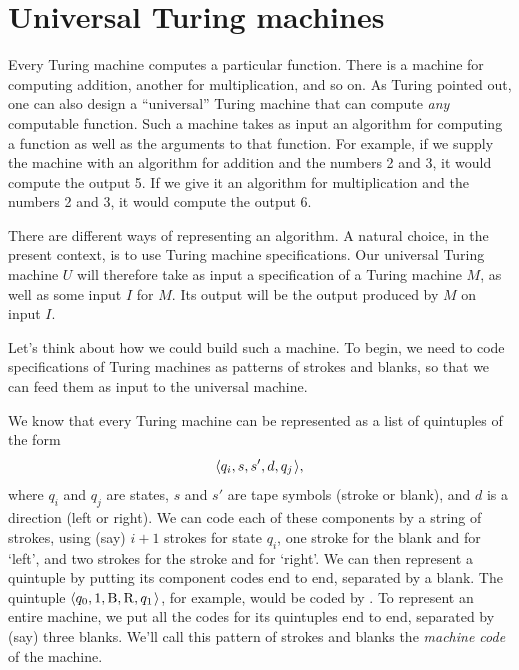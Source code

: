 \section{Universal Turing machines}\label{sec:universal-tm}


Every Turing machine computes a particular function.
There is a machine for computing addition,
another for multiplication,
and so on.
As Turing pointed out,
one can also design a ``universal'' Turing machine that
can compute \emph{any} computable function.
Such a machine takes as input
an algorithm for computing a function
as well as the arguments to that function.
For example,
if we supply the machine with an algorithm for addition and the numbers 2 and 3,
it would compute the output 5.
If we give it an algorithm for multiplication and the numbers 2 and 3,
it would compute the output 6.

There are different ways of representing an algorithm.
A natural choice,
in the present context,
is to use Turing machine specifications.
Our universal Turing machine $U$ will therefore take as input
a specification of a Turing machine $M$,
as well as some input $I$ for $M$.
Its output will be the output produced by $M$ on input $I$.

Let's think about how we could build such a machine.
To begin,
we need to code specifications of Turing machines as patterns of strokes and blanks,
so that we can feed them as input to the universal machine.

We know that every Turing machine can be represented as a list of quintuples of the form
\[
  \t{q_{i}, s, s', d, q_{j}},
\]
where $q_{i}$ and $q_{j}$ are states,
$s$ and $s'$ are tape symbols (stroke or blank),
and $d$ is a direction (left or right).
We can code each of these components by a string of strokes,
using (say) $i+1$ strokes for state $q_{i}$,
one stroke for the blank and for `left',
and two strokes for the stroke and for `right'.
We can then represent a quintuple by putting
its component codes end to end,
separated by a blank.
The quintuple $\t{q_{0}, 1, \mathrm{B}, \mathrm{R}, q_{1}}$, for example,
would be coded by .
To represent an entire machine,
we put all the codes for its quintuples end to end,
separated by (say) three blanks.
We'll call this pattern of strokes and blanks
the \emph{machine code} of the machine.


